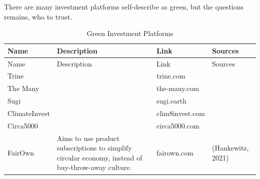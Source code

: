 \documentclass[
  12pt,
  letterpaper,
  DIV=11,
  numbers=noendperiod]{scrartcl}
\begin{document}
There are many investment platforms self-describe as green, but the
questions remains, who to trust.

\def\pandoctableshortcapt{Green Investment Platforms}

\begin{longtable}[]{@{}
  >{\raggedright\arraybackslash}p{}
  >{\raggedright\arraybackslash}p{}
  >{\raggedright\arraybackslash}p{}
  >{\raggedright\arraybackslash}p{}@{}}
\caption[Green Investment Platforms]{Green Investment
Platforms}\tabularnewline
\toprule\noalign{}
\begin{minipage}[b]{\linewidth}\raggedright
Name
\end{minipage} & \begin{minipage}[b]{\linewidth}\raggedright
Description
\end{minipage} & \begin{minipage}[b]{\linewidth}\raggedright
Link
\end{minipage} & \begin{minipage}[b]{\linewidth}\raggedright
Sources
\end{minipage} \\
\midrule\noalign{}
\endfirsthead
\toprule\noalign{}
\begin{minipage}[b]{\linewidth}\raggedright
Name
\end{minipage} & \begin{minipage}[b]{\linewidth}\raggedright
Description
\end{minipage} & \begin{minipage}[b]{\linewidth}\raggedright
Link
\end{minipage} & \begin{minipage}[b]{\linewidth}\raggedright
Sources
\end{minipage} \\
\midrule\noalign{}
\endhead
\bottomrule\noalign{}
\endlastfoot
Trine & & trine.com & \\
The Many & & the-many.com & \\
Sugi & & sugi.earth & \\
ClimateInvest & & clim8invest.com & \\
Circa5000 & & circa5000.com & \\
FairOwn & Aims to use product subscriptions to simplify circular
economy, instead of buy-throw-away culture. & fairown.com & (Hankewitz,
2021) \\
\end{longtable}
\end{document}
